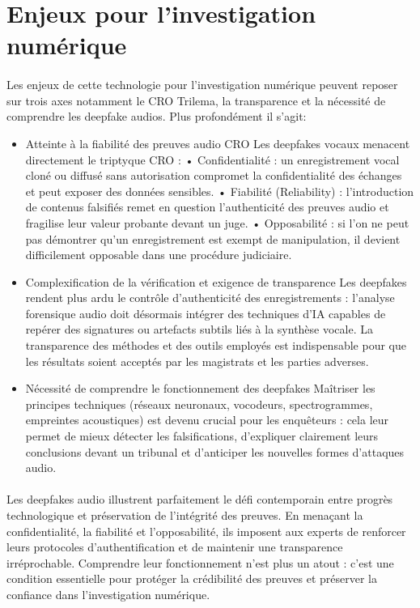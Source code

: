 \documentclass[memoire, 12pt]{report}
\begin{document}
\section{ Enjeux pour l’investigation numérique} 
\paragraph{}Les enjeux de cette technologie pour l'investigation numérique peuvent reposer sur trois axes notamment le CRO Trilema, la transparence et la nécessité de comprendre les deepfake audios. Plus profondément il s'agit:
    \begin{itemize}
        \item Atteinte à la fiabilité des preuves audio CRO
        Les deepfakes vocaux menacent directement le triptyque CRO :
	•	Confidentialité : un enregistrement vocal cloné ou diffusé sans autorisation compromet la confidentialité des échanges et peut exposer des données sensibles.
	•	Fiabilité (Reliability) : l’introduction de contenus falsifiés remet en question l’authenticité des preuves audio et fragilise leur valeur probante devant un juge.
	•	Opposabilité : si l’on ne peut pas démontrer qu’un enregistrement est exempt de manipulation, il devient difficilement opposable dans une procédure judiciaire.
        \item 	Complexification de la vérification et exigence de transparence
Les deepfakes rendent plus ardu le contrôle d’authenticité des enregistrements : l’analyse forensique audio doit désormais intégrer des techniques d’IA capables de repérer des signatures ou artefacts subtils liés à la synthèse vocale. La transparence des méthodes et des outils employés est indispensable pour que les résultats soient acceptés par les magistrats et les parties adverses.
       \item Nécessité de comprendre le fonctionnement des deepfakes
Maîtriser les principes techniques (réseaux neuronaux, vocodeurs, spectrogrammes, empreintes acoustiques) est devenu crucial pour les enquêteurs : cela leur permet de mieux détecter les falsifications, d’expliquer clairement leurs conclusions devant un tribunal et d’anticiper les nouvelles formes d’attaques audio.
    \end{itemize}
\paragraph{}
Les deepfakes audio illustrent parfaitement le défi contemporain entre progrès technologique et préservation de l’intégrité des preuves. En menaçant la confidentialité, la fiabilité et l’opposabilité, ils imposent aux experts de renforcer leurs protocoles d’authentification et de maintenir une transparence irréprochable. Comprendre leur fonctionnement n’est plus un atout : c’est une condition essentielle pour protéger la crédibilité des preuves et préserver la confiance dans l’investigation numérique.
\end{document}
